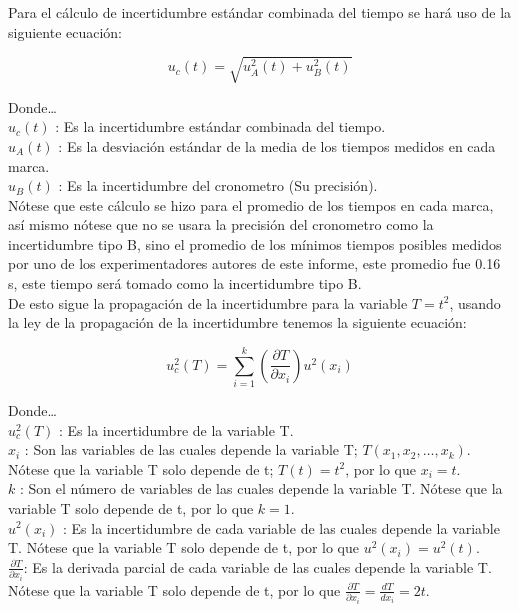 \documentclass[12pt,a4paper]{article}
\begin{document}
Para el cálculo de incertidumbre estándar combinada del tiempo se hará uso de la siguiente ecuación:

\[u_c(t) = \sqrt{u_A^2(t) + u_B^2(t)}\]

Donde…\\

$u_c(t)$ : Es la incertidumbre estándar combinada del tiempo.\\

$u_A(t)$ : Es la desviación estándar de la media de los tiempos medidos en cada marca. \\

$u_B(t)$ : Es la incertidumbre del cronometro (Su precisión).\\

Nótese que este cálculo se hizo para el promedio de los tiempos en cada marca, así mismo nótese que no se usara la precisión del cronometro como la incertidumbre tipo B, sino el promedio de los mínimos tiempos posibles medidos por uno de los experimentadores autores de este informe, este promedio fue 0.16 s, este tiempo será tomado como la incertidumbre tipo B.\\

De esto sigue la propagación de la incertidumbre para la variable $T = t^2$, usando la ley de la propagación de la incertidumbre tenemos la siguiente ecuación:

\[u^2_c (T) = \sum_{i = 1}^k \left( \frac{\partial T}{\partial x_i}\right) u^2(x_i)\]

Donde…\\

$u^2_c(T)$ : Es la incertidumbre de la variable T.\\

$x_i$ : Son las variables de las cuales depende la variable T; $T(x_1, x_2, …, x_k)$. Nótese que la variable T solo depende de t; $T(t) = t^2$, por lo que $x_i = t$.\\

$k$ : Son el número de variables de las cuales depende la variable T. Nótese que la variable T solo depende de t, por lo que $k = 1$.\\

$u^2(x_i)$ : Es la incertidumbre de cada variable de las cuales depende la variable T. Nótese que la variable T solo depende de t, por lo que $u^2(x_i) = u^2(t)$.\\

$\frac{\partial T}{\partial x_i}$: Es la derivada parcial de cada variable de las cuales depende la variable T. Nótese que la variable T solo depende de t, por lo que $\frac{\partial T}{\partial x_i} = \frac{d T}{d x_i} = 2t$.\\
\end{document}

